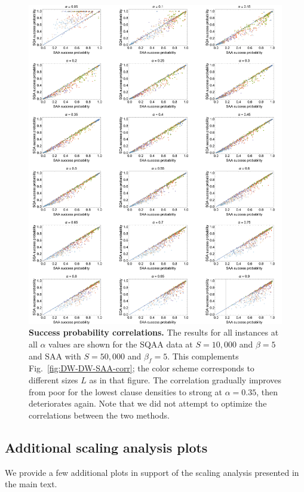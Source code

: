 \begin{figure}
\begin{center}
\includegraphics[width=\textwidth]{chapters/Planted/SAA_50k_vs_SQA_10k}
\caption{\textbf{Success probability correlations.} The results for all instances at all $\alpha$ values are shown for the SQAA data at  $S=10,\!000$ and $\beta=5$ and SAA with $S=50,\!000$ and $\beta_f=5$. This complements Fig.~\ref{fig:DW-DW-SAA-corr}; the color scheme corresponds to different sizes $L$ as in that figure. The correlation gradually improves from poor for the lowest clause densities to strong at $\alpha=0.35$, then deteriorates again.  Note that we did not attempt to optimize the correlations between the two methods.}
\label{fig:corr-SAAvsSQA-all-alphas}
\end{center}
\end{figure}

\subsection{Additional scaling analysis plots} \label{sec:scaling}
We provide a few additional plots in support of the scaling analysis presented in the main text.

